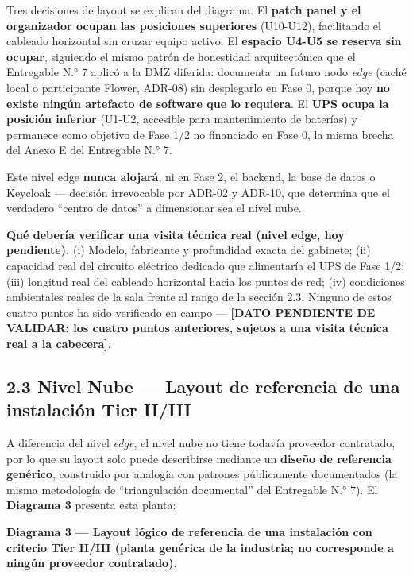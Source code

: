 \documentclass[11pt,a4paper]{article}
\begin{document}
Tres decisiones de layout se explican del diagrama. El \textbf{patch panel y el organizador ocupan las posiciones superiores} (U10-U12), facilitando el cableado horizontal sin cruzar equipo activo. El \textbf{espacio U4-U5 se reserva sin ocupar}, siguiendo el mismo patrón de honestidad arquitectónica que el Entregable N.° 7 aplicó a la DMZ diferida: documenta un futuro nodo \emph{edge} (caché local o participante Flower, ADR-08) sin desplegarlo en Fase 0, porque hoy \textbf{no existe ningún artefacto de software que lo requiera}. El \textbf{UPS ocupa la posición inferior} (U1-U2, accesible para mantenimiento de baterías) y permanece como objetivo de Fase 1/2 no financiado en Fase 0, la misma brecha del Anexo E del Entregable N.° 7.

Este nivel edge \textbf{nunca alojará}, ni en Fase 2, el backend, la base de datos o Keycloak --- decisión irrevocable por ADR-02 y ADR-10, que determina que el verdadero ``centro de datos'' a dimensionar sea el nivel nube.

\textbf{Qué debería verificar una visita técnica real (nivel edge, hoy pendiente).} (i) Modelo, fabricante y profundidad exacta del gabinete; (ii) capacidad real del circuito eléctrico dedicado que alimentaría el UPS de Fase 1/2; (iii) longitud real del cableado horizontal hacia los puntos de red; (iv) condiciones ambientales reales de la sala frente al rango de la sección 2.3. Ninguno de estos cuatro puntos ha sido verificado en campo --- \textbf{{[}DATO PENDIENTE DE VALIDAR: los cuatro puntos anteriores, sujetos a una visita técnica real a la cabecera{]}}.

\subsection{2.3 Nivel Nube --- Layout de referencia de una instalación Tier II/III}\label{nivel-nube-layout-de-referencia-de-una-instalaciuxf3n-tier-iiiii}

A diferencia del nivel \emph{edge}, el nivel nube no tiene todavía proveedor contratado, por lo que su layout solo puede describirse mediante un \textbf{diseño de referencia genérico}, construido por analogía con patrones públicamente documentados (la misma metodología de ``triangulación documental'' del Entregable N.° 7). El \textbf{Diagrama 3} presenta esta planta:

\textbf{Diagrama 3 --- Layout lógico de referencia de una instalación con criterio Tier II/III (planta genérica de la industria; no corresponde a ningún proveedor contratado).}
\end{document}
